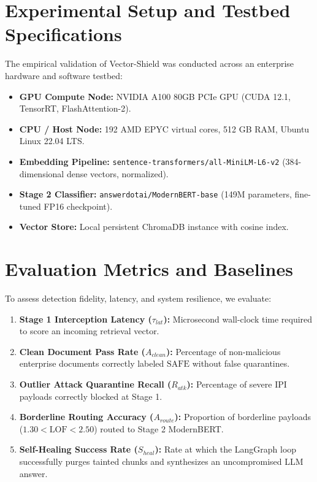 \label{chap:results}
\section{Experimental Setup and Testbed Specifications}
The empirical validation of Vector-Shield was conducted across an enterprise hardware and software testbed:
\begin{itemize}
    \item \textbf{GPU Compute Node:} NVIDIA A100 80GB PCIe GPU (CUDA 12.1, TensorRT, FlashAttention-2).
    \item \textbf{CPU / Host Node:} 192 AMD EPYC virtual cores, 512 GB RAM, Ubuntu Linux 22.04 LTS.
    \item \textbf{Embedding Pipeline:} \texttt{sentence-transformers/all-MiniLM-L6-v2} (384-dimensional dense vectors, normalized).
    \item \textbf{Stage 2 Classifier:} \texttt{answerdotai/ModernBERT-base} (149M parameters, fine-tuned FP16 checkpoint).
    \item \textbf{Vector Store:} Local persistent ChromaDB instance with cosine index.
\end{itemize}

\section{Evaluation Metrics and Baselines}
To assess detection fidelity, latency, and system resilience, we evaluate:
\begin{enumerate}
    \item \textbf{Stage 1 Interception Latency ($\tau_{lat}$):} Microsecond wall-clock time required to score an incoming retrieval vector.
    \item \textbf{Clean Document Pass Rate ($A_{clean}$):} Percentage of non-malicious enterprise documents correctly labeled $\text{SAFE}$ without false quarantines.
    \item \textbf{Outlier Attack Quarantine Recall ($R_{atk}$):} Percentage of severe IPI payloads correctly blocked at Stage 1.
    \item \textbf{Borderline Routing Accuracy ($A_{route}$):} Proportion of borderline payloads ($1.30 < \text{LOF} < 2.50$) routed to Stage 2 ModernBERT.
    \item \textbf{Self-Healing Success Rate ($S_{heal}$):} Rate at which the LangGraph loop successfully purges tainted chunks and synthesizes an uncompromised LLM answer.
\end{enumerate}

